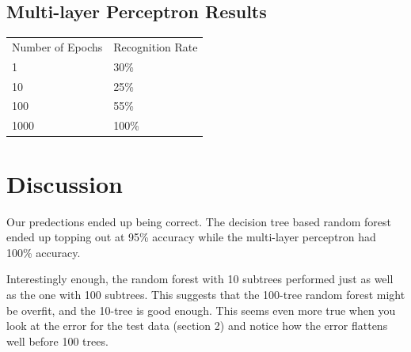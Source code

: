 \documentclass{article}
\begin{document}
\subsection{Multi-layer Perceptron Results}


\begin{tabular} {l l }
  Number of Epochs & Recognition Rate \\
  1                & 30\% \\
  10               & 25\% \\
  100              & 55\% \\
  1000             & 100\% \\
\end{tabular}



\section{Discussion}
Our predections ended up being correct. The decision tree based random forest ended up
topping out at 95\% accuracy while the multi-layer perceptron had 100\% accuracy.

Interestingly enough, the random forest with 10 subtrees performed just as well as the one with 100
subtrees. This suggests that the 100-tree random forest might be overfit, and the 10-tree is good enough.
This seems even more true when you look at the error for the test data (section 2) and notice how the
error flattens well before 100 trees.
\end{document}
